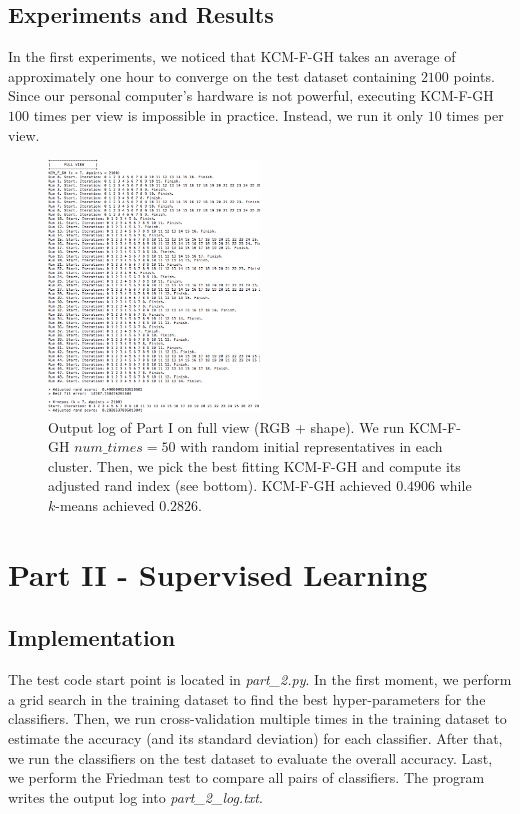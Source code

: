 \documentclass[conference]{IEEEtran}
\begin{document}
\subsection{Experiments and Results}

In the first experiments, we noticed that KCM-F-GH takes an average of approximately one hour to converge on the test dataset containing $2100$ points.
Since our personal computer's hardware is not powerful, executing KCM-F-GH $100$ times per view is impossible in practice.
Instead, we run it only $10$ times per view.

\begin{figure}
\label{part_i_full}
\includegraphics[width=0.50\textwidth]{part_i_full.png}
\caption{Output log of Part I on full view (RGB + shape). We run KCM-F-GH $num\_times = 50$ with random initial representatives in each cluster. Then, we pick the best fitting KCM-F-GH and compute its adjusted rand index (see bottom). KCM-F-GH achieved $0.4906$ while $k$-means achieved $0.2826$.}
\end{figure}

\section{Part II - Supervised Learning}

\subsection{Implementation}

The test code start point is located in \textit{part\_2.py}.
In the first moment, we perform a grid search in the training dataset to find the best hyper-parameters for the classifiers.
Then, we run cross-validation multiple times in the training dataset to estimate the accuracy (and its standard deviation) for each classifier.
After that, we run the classifiers on the test dataset to evaluate the overall accuracy.
Last, we perform the Friedman test to compare all pairs of classifiers.
The program writes the output log into \textit{part\_2\_log.txt}.
\end{document}
